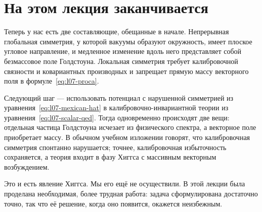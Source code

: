 \begin{classroomqa}
\end{classroomqa}

\section{На этом лекция заканчивается}

Теперь у нас есть две составляющие, обещанные в начале. Непрерывная
глобальная симметрия, у которой вакуумы образуют окружность, имеет плоское угловое направление, и медленное
изменение вдоль него представляет собой безмассовое поле Голдстоуна. Локальная симметрия требует калибровочной
связности и ковариантных производных и запрещает прямую массу векторного
поля в формуле~\eqref{eq:l07-proca}.

Следующий шаг — использовать потенциал с нарушенной симметрией из уравнения~\eqref{eq:l07-mexican-hat} в калибровочно-инвариантной теории из уравнения~\eqref{eq:l07-scalar-qed}. Тогда одновременно происходят две вещи: отдельная частица Голдстоуна исчезает из физического спектра, а векторное поле приобретает массу. В обычном учебном изложении говорят, что калибровочная симметрия спонтанно нарушается; точнее, калибровочная избыточность сохраняется, а теория входит в фазу Хиггса с массивным векторным возбуждением.

Это и есть явление Хиггса. Мы его ещё не осуществили. В этой лекции была проделана необходимая, более трудная работа: задача сформулирована достаточно точно, так что её решение, когда оно появится, окажется неизбежным.
